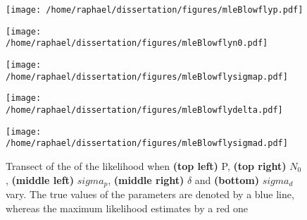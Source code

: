 \documentclass[12pt]{article}
\begin{document}
	\begin{figure}[htb]
		\centering
		\begin{minipage}{0.49\textwidth}
			\centering
			\texttt{[image: /home/raphael/dissertation/figures/mleBlowflyp.pdf]}
		\end{minipage}
		\begin{minipage}{0.49\textwidth}
			\centering
			\texttt{[image: /home/raphael/dissertation/figures/mleBlowflyn0.pdf]}
		\end{minipage}
		\begin{minipage}{0.49\textwidth}
			\centering
			\texttt{[image: /home/raphael/dissertation/figures/mleBlowflysigmap.pdf]}
		\end{minipage}
		\begin{minipage}{0.49\textwidth}
			\centering
			\texttt{[image: /home/raphael/dissertation/figures/mleBlowflydelta.pdf]}
		\end{minipage}
		\begin{minipage}{0.49\textwidth}
			\centering
			\texttt{[image: /home/raphael/dissertation/figures/mleBlowflysigmad.pdf]}
		\end{minipage}
		\caption{Transect of the of the likelihood when \textbf{(top left)} P, \textbf{(top right)} $N_0$,  \textbf{(middle left)} $sigma_p$, \textbf{(middle right)} $\delta$ and \textbf{(bottom)} $sigma_d$ vary. The true values of the parameters are denoted by a blue line, whereas the maximum likelihood estimates by a red one}
		\label{fig:transectBlow}
	\end{figure}
\clearpage

	
	{}
	
\end{document}

